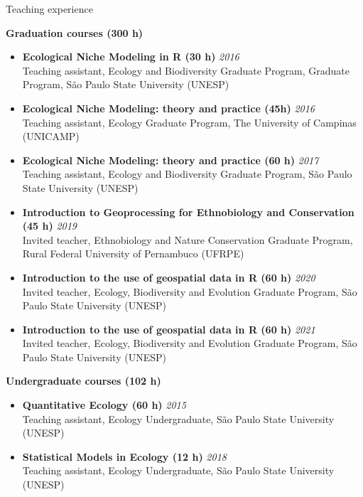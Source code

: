 \documentclass{resume}
\begin{document}
\begin{rSection}{Teaching experience}

{\bf Graduation courses (300 h)}
\begin{itemize} 
\item {\bf Ecological Niche Modeling in R (30 h)} \hfill{\em 2016}\\
Teaching assistant, Ecology and Biodiversity Graduate Program, Graduate Program, São Paulo State University (UNESP)

\item {\bf Ecological Niche Modeling: theory and practice (45h)} \hfill{\em 2016}\\
Teaching assistant, Ecology Graduate Program, The University of Campinas (UNICAMP)

\item {\bf Ecological Niche Modeling: theory and practice (60 h)} \hfill{\em 2017}\\
Teaching assistant, Ecology and Biodiversity Graduate Program, São Paulo State University (UNESP)

\item {\bf Introduction to Geoprocessing for Ethnobiology and Conservation (45 h)} \hfill{\em 2019}\\
Invited teacher, Ethnobiology and Nature Conservation Graduate Program, Rural Federal University of Pernambuco (UFRPE)

\item {\bf Introduction to the use of geospatial data in R (60 h)} \hfill{\em 2020}\\
Invited teacher, Ecology, Biodiversity and Evolution Graduate Program, São Paulo State University (UNESP)

\item {\bf Introduction to the use of geospatial data in R (60 h)} \hfill{\em 2021}\\
Invited teacher, Ecology, Biodiversity and Evolution Graduate Program, São Paulo State University (UNESP)
\end{itemize}

{\bf Undergraduate courses (102 h)}
\begin{itemize}
\item {\bf Quantitative Ecology (60 h)} \hfill{\em 2015}\\
Teaching assistant, Ecology Undergraduate, São Paulo State University (UNESP)

\item {\bf Statistical Models in Ecology (12 h)} \hfill{\em 2018}\\
Teaching assistant, Ecology Undergraduate, São Paulo State University (UNESP)


\end{itemize}
\end{rSection}
\end{document}
